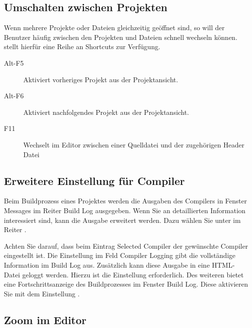 
\subsection{Umschalten zwischen Projekten}

Wenn mehrere Projekte oder Dateien gleichzeitig geöffnet sind, so will der Benutzer häufig zwischen den Projekten und Dateien schnell wechseln können. \codeblocks stellt hierfür eine Reihe an Shortcuts zur Verfügung.

\begin{description}
\item[Alt-F5] Aktiviert vorheriges Projekt aus der Projektansicht.
\item[Alt-F6] Aktiviert nachfolgendes Projekt aus der Projektansicht.
\item[F11] Wechselt im Editor zwischen einer Quelldatei  und der zugehörigen Header Datei 
\end{description}

\subsection{Erweitere Einstellung für Compiler}

Beim Buildprozess eines Projektes werden die Ausgaben des Compilers in Fenster Messages im Reiter Build Log ausgegeben. Wenn Sie an detaillierten Information interessiert sind, kann die Ausgabe erweitert werden. Dazu wählen Sie unter  im Reiter .


Achten Sie darauf, dass beim Eintrag Selected Compiler der gewünschte Compiler eingestellt ist. Die Einstellung  im Feld Compiler Logging gibt die vollständige Information im Build Log aus. Zusätzlich kann diese Ausgabe in eine HTML-Datei geloggt werden. Hierzu ist die Einstellung  erforderlich.
Des weiteren bietet \codeblocks eine Fortschrittsanzeige des Buildprozesses im Fenster Build Log. Diese aktivieren Sie mit dem Einstellung .

\subsection{Zoom im Editor}

